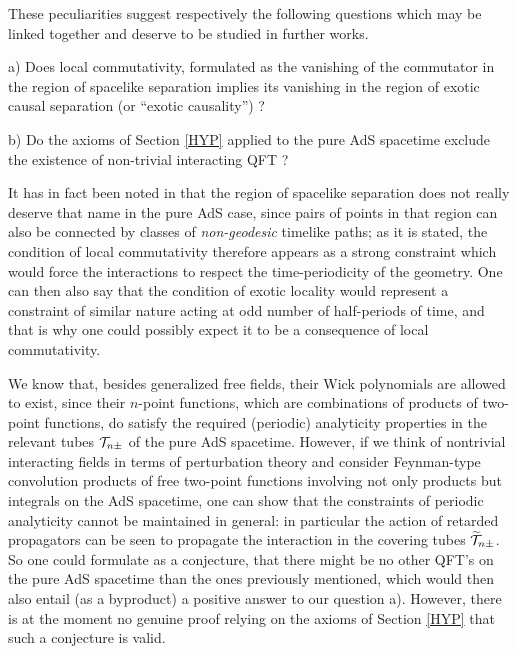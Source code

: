 \documentclass[a4paper,a4paper]{article}
\def\wt{\widetilde}
\begin{document}
These peculiarities suggest respectively the following questions
which may be linked together and deserve to be studied in
further works.

a) Does local commutativity, formulated as the vanishing of the
commutator in the region of spacelike separation implies its
vanishing in the region of exotic causal separation (or
``exotic causality'') ?

b) Do the axioms of Section \ref{HYP} applied to the pure AdS
spacetime
exclude the existence of non-trivial interacting QFT ?

It has in fact been noted in \cite{BFS}
that the region of spacelike separation does not
really deserve that name in the pure AdS case, since
pairs of points in that region can also be connected
by classes of {\sl non-geodesic} timelike paths;
as it is stated, the condition of local commutativity therefore
appears as a strong constraint which would force the
interactions to respect the time-periodicity of the geometry.
One can then also say that the condition of exotic locality
would represent a constraint of similar nature acting at
odd number of half-periods of time, and that is why
one could possibly expect it to be a consequence
of local commutativity.

We know that, besides generalized free fields,
their Wick polynomials
are allowed to exist, since their $n$-point functions,
which are combinations of
products of two-point functions, do satisfy the required
(periodic) analyticity properties in the relevant tubes
${\cal T}_{n\pm}$
of the pure AdS spacetime. However, if we think of
nontrivial interacting fields in terms of perturbation theory
and consider Feynman-type convolution products of free two-point
functions involving not only products but integrals on the AdS
spacetime, one can show that the constraints of periodic analyticity
cannot be maintained in general: in particular the action of
retarded propagators can be seen to propagate the interaction
in the covering tubes
$\wt{\cal T}_{n\pm}$.
So one could formulate as a conjecture, that there might be
no other QFT's on the pure AdS spacetime than the ones previously
mentioned, which would then also entail (as a byproduct) a positive
answer to our question a). However, there is at the moment
no genuine proof relying on the axioms of Section \ref{HYP}
that such a conjecture is valid.
\end{document}
